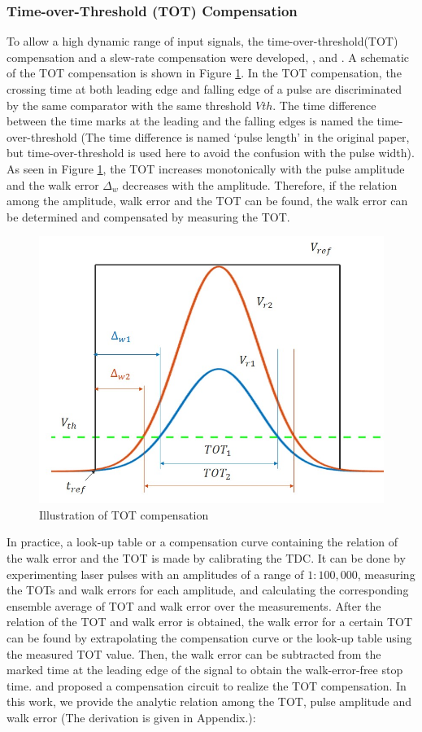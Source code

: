 \subsubsection{Time-over-Threshold (TOT) Compensation}
To allow a high dynamic range of input signals, the time-over-threshold(TOT) compensation and a slew-rate compensation were developed, \citep{kurtti2009pulse}, \citep{kurtti2011integrated} and \citep{nissinen2009integrated}. A schematic of the TOT compensation is shown in Figure \ref{fig:TDC_TOT}. In the TOT compensation, the crossing time at both leading edge and falling edge of a pulse are discriminated by the same comparator with the same threshold $Vth$. The time difference between the time marks at the leading and the falling edges is named the time-over-threshold (The time difference is named ‘pulse length’ in the original paper, but time-over-threshold is used here to avoid the confusion with the pulse width). As seen in Figure \ref{fig:TDC_TOT}, the TOT increases monotonically with the pulse amplitude and the walk error $\Delta_w$ decreases with the amplitude. Therefore, if the relation among the amplitude, walk error and the TOT can be found, the walk error can be determined and compensated by measuring the TOT.\par
\begin{figure}[t!p]
\centering
\includegraphics[width=.8\textwidth]{figures/chapter3_TDC/TOT.jpg}
\caption{Illustration of TOT compensation}
\label{fig:TDC_TOT}
\end{figure}
In practice, a look-up table or a compensation curve containing the relation of the walk error and the TOT is made by calibrating the TDC. It can be done by experimenting laser pulses with an amplitudes of a range of $1:100,000$, measuring the TOTs and walk errors for each amplitude, and calculating the corresponding ensemble average of TOT and walk error over the measurements. After the relation of the TOT and walk error is obtained, the walk error for a certain TOT can be found by extrapolating the compensation curve or the look-up table using the measured TOT value. Then, the walk error can be subtracted from the marked time at the leading edge of the signal to obtain the walk-error-free stop time. \citep{kurtti2009pulse} and \citep{kurtti2011integrated} proposed a compensation circuit to realize the TOT compensation. In this work, we provide the analytic relation among the TOT, pulse amplitude and walk error (The derivation is given in Appendix.): 
